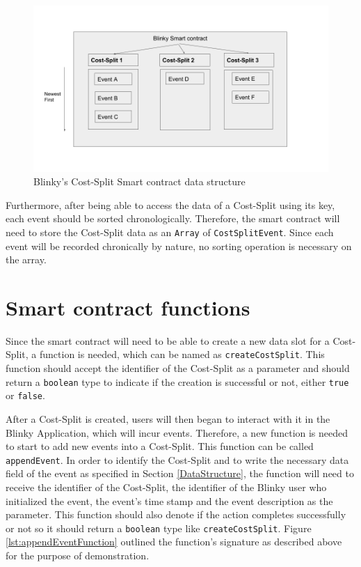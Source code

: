 \begin{figure}[h!]
    \centering
    \includegraphics[width=\linewidth]{BlinkyCostSplitSmartContractDataStructure.png}
    \caption{Blinky's Cost-Split Smart contract data structure \citep{RefWorks:doc:MasteringBlockchain}}
    \label{fig:smartcontractdatastructure}
\end{figure}


Furthermore, after being able to access the data of a Cost-Split using its key, each event should be sorted chronologically. Therefore, the smart contract will need to store the Cost-Split data as an \texttt{Array} of \texttt{CostSplitEvent}. Since each event will be recorded chronically by nature, no sorting operation is necessary on the array.

\section{Smart contract functions}
\label{section:SmartContractFunctions}

Since the smart contract will need to be able to create a new data slot for a Cost-Split, a function is needed, which can be named as \texttt{createCostSplit}. This function should accept the identifier of the Cost-Split as a parameter and should return a \texttt{boolean} type to indicate if the creation is successful or not, either \texttt{true} or \texttt{false}.

After a Cost-Split is created, users will then began to interact with it in the Blinky Application, which will incur events. Therefore, a new function is needed to start to add new events into a Cost-Split. This function can be called \texttt{appendEvent}. In order to identify the Cost-Split and to write the necessary data field of the event as specified in Section \ref{DataStructure}, the function will need to receive the identifier of the Cost-Split, the identifier of the Blinky user who initialized the event, the event's time stamp and the event description as the parameter. This function should also denote if the action completes successfully or not so it should return a \texttt{boolean} type like \texttt{createCostSplit}. Figure \ref{lst:appendEventFunction} outlined the function's signature as described above for the purpose of demonstration.

